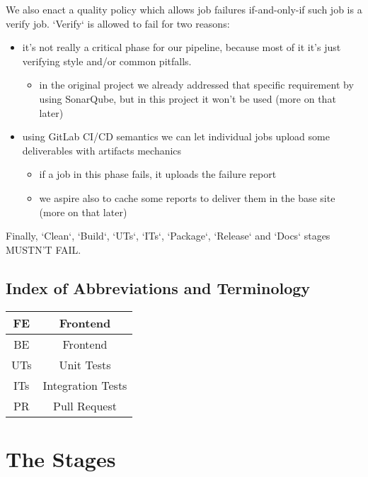 \documentclass[a4paper,10pt]{scrartcl}
\begin{document}
We also enact a quality policy which allows job failures if-and-only-if such job is a verify job. `Verify` is allowed to fail for two reasons:
\begin{itemize}
    \item it's not really a critical phase for our pipeline, because most of it it's just verifying style and/or common pitfalls.
    \begin{itemize}
        \item in the original project we already addressed that specific requirement by using SonarQube, but in this project it won't be used (more on that later)
    \end{itemize}
    \item using GitLab CI/CD semantics we can let individual jobs upload some deliverables with artifacts mechanics
    \begin{itemize}
        \item if a job in this phase fails, it uploads the failure report
        \item we aspire also to cache some reports to deliver them in the base site (more on that later)
    \end{itemize}
\end{itemize}

Finally, `Clean`, `Build`, `UTs`, `ITs`, `Package`, `Release` and `Docs` stages MUSTN'T FAIL.

\subsection{Index of Abbreviations and Terminology}

\begin{center}
    \begin{tabular}{|c|c|}
         \hline
         FE & Frontend \\
         \hline
         BE & Frontend \\
         \hline
         UTs & Unit Tests \\
         \hline
         ITs & Integration Tests \\
         \hline
         PR & Pull Request \\
         \hline
    \end{tabular}
\end{center}

\section{The Stages}
\end{document}
